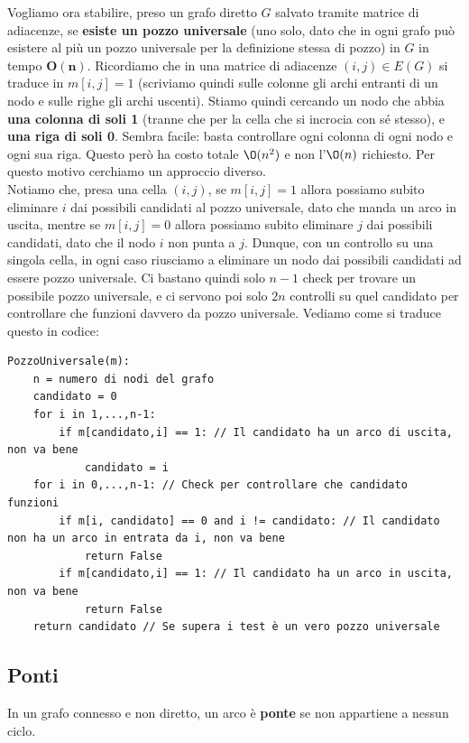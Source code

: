 \documentclass[11pt, a4paper, titlepage, oneside]{scrbook}
\begin{document}
Vogliamo ora stabilire, preso un grafo diretto $G$ salvato tramite matrice di adiacenze, se \textbf{esiste un pozzo universale} (uno solo, dato che in ogni grafo può esistere al più un pozzo universale per la definizione stessa di pozzo) in $G$ in tempo $\textbf{O}\bm{(n)}$. Ricordiamo che in una matrice di adiacenze $(i,j) \in E(G)$ si traduce in $m[i,j] = 1$ (scriviamo quindi sulle colonne gli archi entranti di un nodo e sulle righe gli archi uscenti). Stiamo quindi cercando un nodo che abbia \textbf{una colonna di soli 1} (tranne che per la cella che si incrocia con sé stesso), e \textbf{una riga di soli 0}. Sembra facile: basta controllare ogni colonna di ogni nodo e ogni sua riga. Questo però ha costo totale $\O(n^2)$ e non l'$\O(n)$ richiesto. Per questo motivo cerchiamo un approccio diverso. \\
Notiamo che, presa una cella $(i,j)$, se $m[i,j] = 1$ allora possiamo subito eliminare $i$ dai possibili candidati al pozzo universale, dato che manda un arco in uscita, mentre se $m[i,j] = 0$ allora possiamo subito eliminare $j$ dai possibili candidati, dato che il nodo $i$ non punta a $j$. Dunque, con un controllo su una singola cella, in ogni caso riusciamo a eliminare un nodo dai possibili candidati ad essere pozzo universale. Ci bastano quindi solo $n-1$ check per trovare un possibile pozzo universale, e ci servono poi solo $2n$ controlli su quel candidato per controllare che funzioni davvero da pozzo universale. Vediamo come si traduce questo in codice:
\begin{lstlisting}[style=Python]
PozzoUniversale(m):
    n = numero di nodi del grafo
    candidato = 0
    for i in 1,...,n-1:
        if m[candidato,i] == 1: // Il candidato ha un arco di uscita, non va bene
            candidato = i
    for i in 0,...,n-1: // Check per controllare che candidato funzioni
        if m[i, candidato] == 0 and i != candidato: // Il candidato non ha un arco in entrata da i, non va bene
            return False
        if m[candidato,i] == 1: // Il candidato ha un arco in uscita, non va bene
            return False
    return candidato // Se supera i test è un vero pozzo universale
\end{lstlisting}

\subsection{Ponti}

\begin{Definizione}[Ponte]
\label{def-ponte}
In un grafo connesso e non diretto, un arco è \textbf{ponte} se non appartiene a nessun ciclo.
\end{Definizione}
\end{document}
